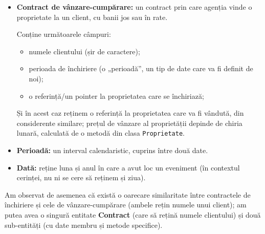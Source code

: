 \begin{itemize}
    \item \textbf{Contract de vânzare-cumpărare:} un contract prin care agenția vinde o proprietate la un client, cu banii jos sau în rate.

    Conține următoarele câmpuri:
    \begin{itemize}
        \item numele clientului (șir de caractere);
        \item perioada de închiriere (o „perioadă”, un tip de date care va fi definit de noi);
        \item o referință/un pointer la proprietatea care se închiriază;
    \end{itemize}

    Și în acest caz reținem o referință la proprietatea care va fi vândută, din considerente similare; prețul de vânzare al proprietății depinde de chiria lunară, calculată de o metodă din clasa \texttt{Proprietate}.
    
    \item \textbf{Perioadă:} un interval calendaristic, cuprins între două date.
    
    \item \textbf{Dată:} reține luna și anul în care a avut loc un eveniment (în contextul cerinței, nu ni se cere să reținem și ziua).
\end{itemize}

Am observat de asemenea că există o oarecare similaritate între contractele de închiriere și cele de vânzare-cumpărare (ambele rețin numele unui client); am putea avea o singură entitate \textbf{Contract} (care să rețină numele clientului) și două sub-entități (cu date membru și metode specifice).
